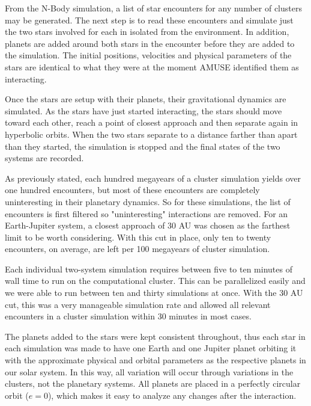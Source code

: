 \documentclass[12pt]{article}
\begin{document}
    From the N-Body simulation, a list of star encounters for any number of 
    clusters may be generated. The next step is to read these encounters and
    simulate just the two stars involved for each in isolated from the 
    environment. In addition, planets are added around both stars in the
    encounter before they are added to the simulation. The initial positions,
    velocities and physical parameters of the stars are identical to what they
    were at the moment AMUSE identified them as interacting. 

    Once the stars are setup with their planets, their gravitational dynamics
    are simulated. As the stars have just started interacting, the stars should
    move toward each other, reach a point of closest approach and then separate again
    in hyperbolic orbits. When the two stars separate to a distance farther than
    apart than they started, the simulation is stopped and the final states of the two
    systems are recorded. 

    As previously stated, each hundred megayears of a cluster simulation yields over
    one hundred encounters, but most of these encounters are completely uninteresting
    in their planetary dynamics. So for these simulations, the list of encounters is 
    first filtered so "uninteresting" interactions are removed. For an Earth-Jupiter
    system, a closest approach of 30 AU was chosen as the farthest limit to be
    worth considering. With this cut in place, only ten to twenty encounters, on
    average, are left per 100 megayears of cluster simulation.


    Each individual two-system simulation requires between five to ten 
    minutes of wall time to run on the computational cluster. This can be
    parallelized easily and we were able to run between ten and thirty 
    simulations at once. With the 30 AU cut, this was a very manageable 
    simulation rate and allowed all relevant encounters in a cluster simulation
    within 30 minutes in most cases.

    The planets added to the stars were kept consistent throughout, thus 
    each star in each simulation was made to have one Earth and one Jupiter planet
    orbiting it with the approximate physical and orbital
    parameters as the respective planets in our solar system. 
    In this way, all variation will occur through variations in the clusters, not
    the planetary systems.
    All planets are
    placed in a perfectly circular orbit ($e=0$), which makes it easy to analyze
    any changes after the interaction.
\end{document}
